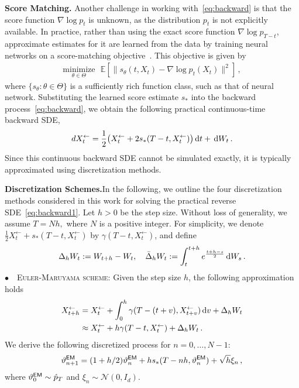 \documentclass[11pt]{article}
\def\rmd{{\,\rm d}}
\def\E{\mathbb E}
\begin{document}
\vspace{0.2cm}
\noindent \textbf{Score Matching.} \quad Another  challenge in working with~\eqref{eq:backward} is that the score function $\nabla \log p_t$ is unknown, as the distribution $p_t$ is not explicitly available.
In practice, rather than using the exact score function $\nabla\log p_{T-t}$, approximate estimates for it are learned from the data by training neural networks on a score-matching objective~\cite{hyvarinen2005estimation,vincent2011connection,song2020sliced}. This objective is given by
\begin{align*}
\underset{\theta\in\Theta}{\text{minimize}}~~~ \E[\|s_\theta(t,X_t)-\nabla \log p_t(X_t)\|^2]\,,
\end{align*}
where $\{s_\theta:\theta\in\Theta\}$ is a sufficiently rich function class, such as that of neural network.
Substituting the learned score estimate $s_*$ into the backward process~\eqref{eq:backward}, we obtain the following practical continuous-time backward SDE,
\begin{equation}
dX^{\leftarrow}_t= \frac{1}{2}\big(X^{\leftarrow}_t+ 2s_{*}(T-t,X^{\leftarrow}_t)\big)\rmd t + \rmd W_t\,.
\label{eq:backward1}
\end{equation}
Since this continuous backward SDE cannot be simulated exactly, it is typically approximated using discretization methods.

\vspace{0.2cm}
\noindent \textbf{Discretization Schemes.}\quad In the following, we outline the four discretization methods considered in this work for solving the practical reverse SDE~\eqref{eq:backward1}. 
Let $h>0$ be the step size.
Without loss of generality, we assume $T = Nh,$
where $N$ is a positive integer.
For simplicity, we denote $\frac{1}{2}X^{\leftarrow}_t+ s_{*}(T-t,X^{\leftarrow}_t)$ by $\gamma(T-t,X^{\leftarrow}_t)$, and define 
\begin{align*}
\Delta_hW_t:=W_{t+h}-W_t,\quad %
\bar{\Delta}_hW_t:=\int_t^{t+h}e^{\frac{t+h-s}{2}}\rmd W_s\,.
\end{align*}
\noindent $\bullet$~~\textsc{Euler-Maruyama scheme}:\quad
Given the step size $h$, the following approximation holds
\begin{align*}
X^{\leftarrow}_{t+h}
&=X^{\leftarrow}_t+\int_0^h \gamma(T-(t+v),X^{\leftarrow}_{t+v})\rmd v+\Delta_hW_t \nonumber \\
&\approx X_t^{\leftarrow}+ h\gamma(T-t,X^{\leftarrow}_t)+\Delta_hW_t\,.
\end{align*}
We derive the following discretized process for $n=0,\dots,N-1$:
\begin{align*}
\vartheta^{\sf EM}_{n+1}=(1+h/2)\vartheta^{\sf EM}_{n}+hs_{*}(T-nh,\vartheta^{\sf EM}_n)+\sqrt{h}\xi_n\,,
\end{align*}
where $\vartheta^{\sf EM}_{0}\sim \hat p_T$ and $\xi_n\sim \mathcal{N}(0,I_{d}).$
\end{document}
